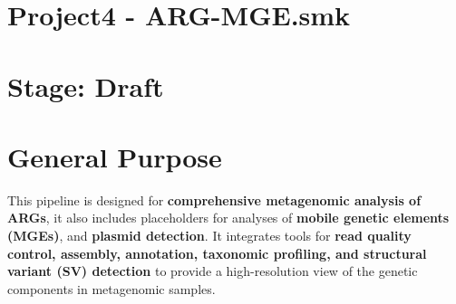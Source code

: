 \documentclass[11pt]{article}
\begin{document}
\newpage
\setcounter{section}{1}
\setcounter{subsection}{0}
\section*{Project4 - ARG-MGE.smk}
\section*{Stage: Draft}   
\section*{General Purpose}

This pipeline is designed for \textbf{comprehensive metagenomic analysis of ARGs}, it also includes placeholders for analyses of \textbf{mobile genetic elements (MGEs)}, and \textbf{plasmid detection}. It integrates tools for \textbf{read quality control, assembly, annotation, taxonomic profiling, and structural variant (SV) detection} to provide a high-resolution view of the genetic components in metagenomic samples.
\end{document}
